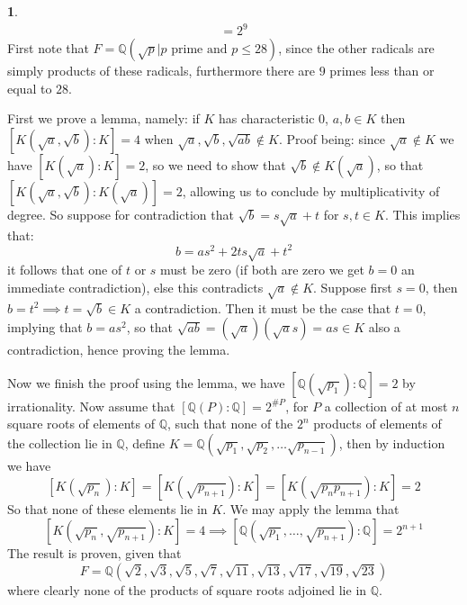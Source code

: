 \documentclass[11pt]{article}
\theoremstyle{definition}
\newtheorem{pb}{}
\begin{document}
    \begin{pb}
        \begin{align*}
            [F:\mathbb{Q}] = 2^9
        \end{align*}
        First note that \(F = \mathbb{Q}(\sqrt{p}\vert p \text{ prime and }p \leq 28)\), since the other radicals are simply products of these radicals, furthermore there are \(9\) primes less than or equal to \(28\).

        First we prove a lemma, namely: if 
        \(K\) has characteristic 0, \(a,b \in K\) then \([K(\sqrt{a},\sqrt{b}):K] = 4\) when
        \(\sqrt{a},\sqrt{b},\sqrt{ab} \not \in K\). Proof being:
        since \(\sqrt{a} \not \in K\) we have \([K(\sqrt{a}):K] = 2\), so we need to show that \(\sqrt{b} \not \in K(\sqrt{a})\), so that 
        \([K(\sqrt{a},\sqrt{b}):K(\sqrt{a})] = 2\), allowing us to conclude by multiplicativity of degree. So suppose for contradiction that
        \(\sqrt{b} = s\sqrt{a} + t\) for \(s,t \in K\). This implies that:
        \[b = as^2 + 2ts\sqrt{a} + t^2\]
        it follows that one of \(t\) or \(s\) must be zero (if both are zero we get \(b=0\) an immediate contradiction), else this contradicts
        \(\sqrt{a} \not \in K\). Suppose first \(s = 0\), then \(b = t^2 \implies t = \sqrt{b} \in K\) a contradiction. Then it must be the case that \(t = 0\), implying that \(b = as^2\), so that \(\sqrt{ab} = (\sqrt{a})(\sqrt{a}s) = as \in K\) also a contradiction, hence proving the lemma.

        Now we finish the proof using the lemma, we have \([\mathbb{Q}(\sqrt{p_1}):\mathbb{Q}] = 2\) by irrationality. Now assume that \([\mathbb{Q}(P):\mathbb{Q}] = 2^{\# P}\), for \(P\) a collection of at most \(n\) square roots of elements of \(\mathbb{Q}\), such that none of the \(2^n\) products of elements of the collection lie in \(\mathbb{Q}\), define
        \(K = \mathbb{Q}(\sqrt{p_1},\sqrt{p_2}, \hdots \sqrt{p_{n-1}})\), then by induction we have 
        \[[K(\sqrt{p_n}):K] = [K(\sqrt{p_{n+1}}):K] = [K(\sqrt{p_np_{n+1}}):K] = 2\]
        So that none of these elements lie in \(K\). We may apply the lemma that
        \[[K(\sqrt{p_n},\sqrt{p_{n+1}}):K] = 4 \implies [\mathbb{Q}(\sqrt{p_1}, \hdots, \sqrt{p_{n+1}}):\mathbb{Q}] = 2^{n+1}\]
        The result is proven, given that
        \[F = \mathbb{Q}(\sqrt{2},\sqrt{3},\sqrt{5},\sqrt{7},\sqrt{11},\sqrt{13},\sqrt{17},\sqrt{19},\sqrt{23})\]
        where clearly none of the products of square roots adjoined lie in \(\mathbb{Q}\).
    \end{pb}
\end{document}
